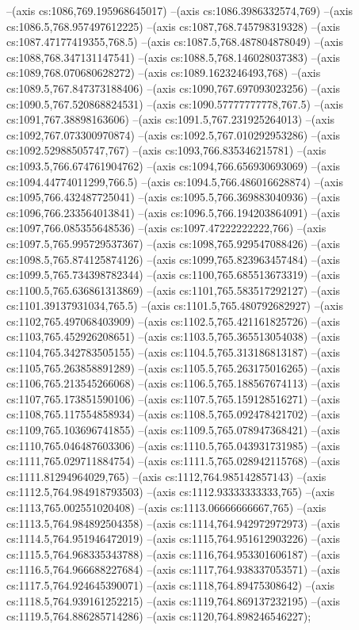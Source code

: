 --(axis cs:1086,769.195968645017)
--(axis cs:1086.3986332574,769)
--(axis cs:1086.5,768.957497612225)
--(axis cs:1087,768.745798319328)
--(axis cs:1087.47177419355,768.5)
--(axis cs:1087.5,768.487804878049)
--(axis cs:1088,768.347131147541)
--(axis cs:1088.5,768.146028037383)
--(axis cs:1089,768.070680628272)
--(axis cs:1089.1623246493,768)
--(axis cs:1089.5,767.847373188406)
--(axis cs:1090,767.697093023256)
--(axis cs:1090.5,767.520868824531)
--(axis cs:1090.57777777778,767.5)
--(axis cs:1091,767.38898163606)
--(axis cs:1091.5,767.231925264013)
--(axis cs:1092,767.073300970874)
--(axis cs:1092.5,767.010292953286)
--(axis cs:1092.52988505747,767)
--(axis cs:1093,766.835346215781)
--(axis cs:1093.5,766.674761904762)
--(axis cs:1094,766.656930693069)
--(axis cs:1094.44774011299,766.5)
--(axis cs:1094.5,766.486016628874)
--(axis cs:1095,766.432487725041)
--(axis cs:1095.5,766.369883040936)
--(axis cs:1096,766.233564013841)
--(axis cs:1096.5,766.194203864091)
--(axis cs:1097,766.085355648536)
--(axis cs:1097.47222222222,766)
--(axis cs:1097.5,765.995729537367)
--(axis cs:1098,765.929547088426)
--(axis cs:1098.5,765.874125874126)
--(axis cs:1099,765.823963457484)
--(axis cs:1099.5,765.734398782344)
--(axis cs:1100,765.685513673319)
--(axis cs:1100.5,765.636861313869)
--(axis cs:1101,765.583517292127)
--(axis cs:1101.39137931034,765.5)
--(axis cs:1101.5,765.480792682927)
--(axis cs:1102,765.497068403909)
--(axis cs:1102.5,765.421161825726)
--(axis cs:1103,765.452926208651)
--(axis cs:1103.5,765.365513054038)
--(axis cs:1104,765.342783505155)
--(axis cs:1104.5,765.313186813187)
--(axis cs:1105,765.263858891289)
--(axis cs:1105.5,765.263175016265)
--(axis cs:1106,765.213545266068)
--(axis cs:1106.5,765.188567674113)
--(axis cs:1107,765.173851590106)
--(axis cs:1107.5,765.159128516271)
--(axis cs:1108,765.117554858934)
--(axis cs:1108.5,765.092478421702)
--(axis cs:1109,765.103696741855)
--(axis cs:1109.5,765.078947368421)
--(axis cs:1110,765.046487603306)
--(axis cs:1110.5,765.043931731985)
--(axis cs:1111,765.029711884754)
--(axis cs:1111.5,765.028942115768)
--(axis cs:1111.81294964029,765)
--(axis cs:1112,764.985142857143)
--(axis cs:1112.5,764.984918793503)
--(axis cs:1112.93333333333,765)
--(axis cs:1113,765.002551020408)
--(axis cs:1113.06666666667,765)
--(axis cs:1113.5,764.984892504358)
--(axis cs:1114,764.942972972973)
--(axis cs:1114.5,764.951946472019)
--(axis cs:1115,764.951612903226)
--(axis cs:1115.5,764.968335343788)
--(axis cs:1116,764.953301606187)
--(axis cs:1116.5,764.966688227684)
--(axis cs:1117,764.938337053571)
--(axis cs:1117.5,764.924645390071)
--(axis cs:1118,764.89475308642)
--(axis cs:1118.5,764.939161252215)
--(axis cs:1119,764.869137232195)
--(axis cs:1119.5,764.886285714286)
--(axis cs:1120,764.898246546227);

